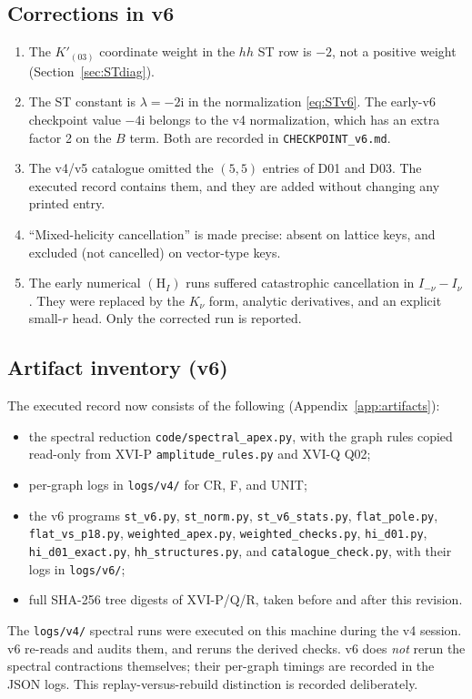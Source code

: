 \documentclass[11pt,a4paper]{article}
\newcommand{\ii}{\mathrm i}
\newcommand{\HI}{(\mathrm H_I)}
\newcommand{\loc}[1]{\nolinkurl{#1}}
\theoremstyle{plain}
\theoremstyle{definition}
\theoremstyle{remark}
\numberwithin{equation}{section}
\begin{document}
\subsection{Corrections in v6}

\begin{enumerate}[label=\textup{(\roman*)}]
\item The \(K'_{(03)}\) coordinate weight in the \(hh\) ST row is
\(-2\), not a positive weight (Section~\ref{sec:STdiag}).
\item The ST constant is \(\lambda=-2\ii\) in the normalization
\eqref{eq:STv6}.
The early-v6 checkpoint value \(-4\ii\) belongs to the v4
normalization, which has an extra factor 2 on the \(B\) term.
Both are recorded in \loc{CHECKPOINT_v6.md}.
\item The v4/v5 catalogue omitted the \((5,5)\) entries of D01 and
D03.
The executed record contains them, and they are added without
changing any printed entry.
\item ``Mixed-helicity cancellation'' is made precise: absent on
lattice keys, and excluded (not cancelled) on vector-type keys.
\item The early numerical \(\HI\) runs suffered catastrophic
cancellation in \(I_{-\nu}-I_\nu\).
They were replaced by the \(K_\nu\) form, analytic derivatives,
and an explicit small-\(r\) head.
Only the corrected run is reported.
\end{enumerate}

\subsection{Artifact inventory (v6)}

The executed record now consists of the following
(Appendix~\ref{app:artifacts}):
\begin{itemize}
\item the spectral reduction \loc{code/spectral_apex.py}, with the
graph rules copied read-only from XVI-P
\loc{amplitude_rules.py} and XVI-Q Q02;
\item per-graph logs in \loc{logs/v4/} for CR, F, and UNIT;
\item the v6 programs \loc{st_v6.py}, \loc{st_norm.py},
\loc{st_v6_stats.py}, \loc{flat_pole.py}, \loc{flat_vs_p18.py},
\loc{weighted_apex.py}, \loc{weighted_checks.py}, \loc{hi_d01.py},
\loc{hi_d01_exact.py}, \loc{hh_structures.py}, and
\loc{catalogue_check.py}, with their logs in \loc{logs/v6/};
\item full SHA-256 tree digests of XVI-P/Q/R, taken before and after
this revision.
\end{itemize}
The \loc{logs/v4/} spectral runs were executed on this machine
during the v4 session.
v6 re-reads and audits them, and reruns the derived checks.
v6 does \emph{not} rerun the spectral contractions themselves;
their per-graph timings are recorded in the JSON logs.
This replay-versus-rebuild distinction is recorded deliberately.
\end{document}
